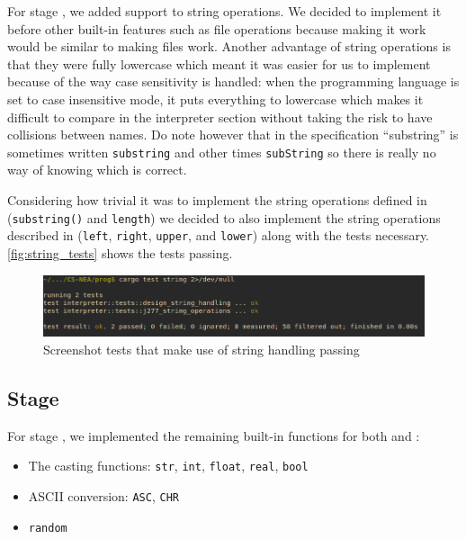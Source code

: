 \documentclass{article}
\newcommand{\subsecnum}{\the\value{subsection}}
\begin{document}
For stage \subsecnum, we added support to string operations. We decided to implement it
before other built-in features such as file operations because making it work
would be similar to making files work. Another advantage of string operations
is that they were fully lowercase which meant it was easier for us to implement
because of the way case sensitivity is handled: when the programming language
is set to case insensitive mode, it puts everything to lowercase which makes it
difficult to compare in the interpreter section without taking the risk to have
collisions between names. Do note however that in the specification
``substring'' is sometimes written \texttt{substring} and other times
\texttt{subString} so there is really no way of knowing which is correct.

Considering how trivial it was to implement the string operations defined in
 (\texttt{substring()} and \texttt{length}) we decided to also
implement the string operations described in  (\texttt{left},
\texttt{right}, \texttt{upper}, and \texttt{lower}) along with the tests
necessary. \autoref{fig:string_tests} shows the tests passing.

\begin{figure}
	\includegraphics[width=\textwidth]{string_tests}
	\caption{Screenshot tests that make use of string handling passing}
	\label{fig:string_tests}
\end{figure}

\subsection{Stage \subsecnum}

For stage \subsecnum, we implemented the remaining built-in functions for both
 and :

\begin{itemize}
	\item The casting functions: \texttt{str}, \texttt{int}, \texttt{float},
		\texttt{real}, \texttt{bool}
	\item ASCII conversion: \texttt{ASC}, \texttt{CHR}
	\item \texttt{random}
\end{itemize}
\end{document}
